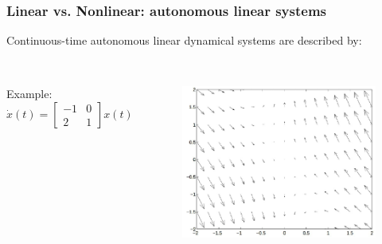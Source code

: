 \documentclass{beamer}
\begin{document}
	\begin{frame}
		\frametitle{Linear vs. Nonlinear: autonomous linear systems}
		Continuous-time autonomous linear dynamical systems are described by:\\
		\smallskip
		\\
		\begin{columns}
			Example: $\dot{x}(t) = \begin{bmatrix} -1 & 0 \\ 2 & 1 \end{bmatrix} x(t)$
			
			\begin{figure}
				\includegraphics[width=1\linewidth]{autonomous}
			\end{figure}
		\end{columns}
	\end{frame}
	
	
\end{document}
